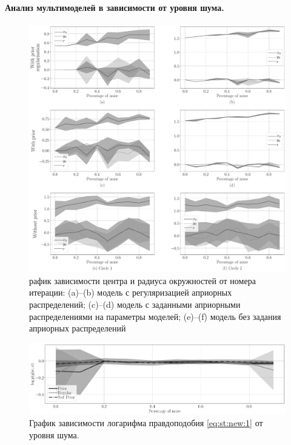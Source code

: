 \paragraph{Анализ мультимоделей в зависимости от уровня шума.} 
\begin{figure}[h!t]\center
\includegraphics[width=1\textwidth]{results/priorexpert/experiment_synthetic_param_progress_noise}
\caption{рафик зависимости центра и радиуса окружностей от номера итерации: (a)--(b) модель с регуляризацией априорных распределений; (c)--(d) модель с заданными априорными распределениями на параметры моделей; (e)--(f) модель без задания априорных распределений}
\label{experiment:st:3:1}
\end{figure}

\begin{figure}[h!t]\center
\includegraphics[width=1\textwidth]{results/priorexpert/experiment_synt_likelihood_progress_noise}
\caption{График зависимости логарифма правдоподобия \eqref{eq:st:new:1} от уровня шума.}
\label{experiment:st:3:2}
\end{figure}

